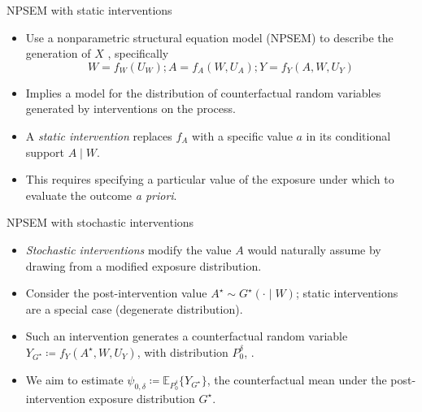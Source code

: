 \documentclass{beamer}
\newcommand{\E}{\mathbb{E}}
\begin{document}
\begin{frame}[c]{NPSEM with static interventions}

\begin{center}
\begin{itemize}
  \itemsep10pt
  \item Use a nonparametric structural equation model (NPSEM) to describe the
    generation of $X$ \citep{pearl2009causality}, specifically
    \begin{equation*}
      W = f_W(U_W); A = f_A(W, U_A); Y = f_Y(A, W, U_Y)
    \end{equation*}
  \item Implies a model for the distribution of counterfactual random variables
    generated by interventions on the process.
  \item A \textit{static intervention} replaces $f_A$ with a specific value $a$
    in its conditional support $A \mid W$.
  \item This requires specifying a particular value of the exposure under which
    to evaluate the outcome \textit{a priori}.
\end{itemize}
\end{center}

\note{
}

\end{frame}


\begin{frame}[c]{NPSEM with stochastic interventions}

\begin{center}
\begin{itemize}
  \itemsep10pt
  \item \textit{Stochastic interventions} modify the value $A$ would naturally
    assume by drawing from a modified exposure distribution.
  \item Consider the post-intervention value $A^{\star} \sim G^{\star}(\cdot
    \mid W)$; static interventions are a special case (degenerate distribution).
  \item Such an intervention generates a counterfactual random variable
    $Y_{G^{\star}} \coloneqq f_Y(A^{\star}, W, U_Y)$, with distribution
    $P_0^{\delta}$, .
  \item We aim to estimate $\psi_{0,\delta} \coloneqq \E_{P_0^{\delta}}
    \{Y_{G^{\star}}\}$, the counterfactual mean under the post-intervention
    exposure distribution $G^{\star}$.
\end{itemize}
\end{center}

\note{
}

\end{frame}
\end{document}
